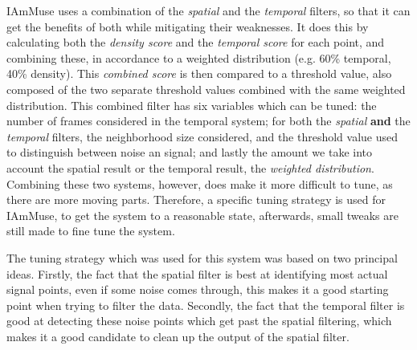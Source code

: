 IAmMuse uses a combination of the \textit{spatial} and the \textit{temporal} filters, so that it can get the benefits of both while mitigating their weaknesses.
It does this by calculating both the \textit{density score} and the \textit{temporal score} for each point, and combining these, in accordance to a weighted distribution (e.g. 60\% temporal, 40\% density). 
This \textit{combined score} is then compared to a threshold value, also composed of the two separate threshold values combined with the same weighted distribution.
This combined filter has six variables which can be tuned: the number of frames considered in the temporal system; for both the \textit{spatial} \textbf{and} the \textit{temporal} filters, the neighborhood size considered, and the threshold value used to distinguish between noise an signal; and lastly the amount we take into account the spatial result or the temporal result, the \textit{weighted distribution}.
Combining these two systems, however, does make it more difficult to tune, as there are more moving parts.
Therefore, a specific tuning strategy is used for IAmMuse, to get the system to a reasonable state, afterwards, small tweaks are still made to fine tune the system.

The tuning strategy which was used for this system was based on two principal ideas.
Firstly, the fact that the spatial filter is best at identifying most actual signal points, even if some noise comes through, this makes it a good starting point when trying to filter the data.
Secondly, the fact that the temporal filter is good at detecting these noise points which get past the spatial filtering, which makes it a good candidate to clean up the output of the spatial filter.

